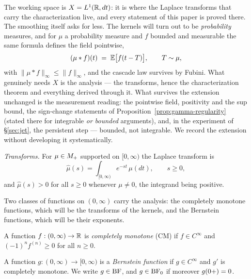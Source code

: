 \begin{remark}\label{rem:signal-model}
The working space is $X = L^1(\mathbb{R}, dt)$: it is where the Laplace transforms that carry the
characterization live, and every statement of this paper is proved there. The smoothing
itself asks for less. The kernels will turn out to be \emph{probability} measures, and for
$\mu$ a probability measure and $f$ bounded and measurable the same formula defines the
field pointwise,
\[
  (\mu * f)(t) \;=\; \mathbb{E}\bigl[f(t - T)\bigr], \qquad T \sim \mu,
\]
with $\|\mu * f\|_\infty \le \|f\|_\infty$, and the cascade law survives by Fubini. What
genuinely needs $X$ is the analysis --- the transforms, hence the characterization theorem
and everything derived through it. What survives the extension unchanged is the
measurement reading: the pointwise field, positivity and the sup bound, the sign-change
statements of Proposition~\ref{prop:gamma-regularity} (stated there for integrable
\emph{or bounded} arguments), and, in the experiment of \S\ref{sec:jet}, the persistent
step --- bounded, not integrable. We record the extension without developing it
systematically.
\end{remark}

\emph{Transforms.} For $\mu \in M_+$ supported on $[0,\infty)$ the Laplace transform is
\[
  \hat\mu(s) = \int_{[0,\infty)} e^{-st}\,\mu(dt), \qquad s \ge 0 ,
\]
and $\hat\mu(s) > 0$ for all $s \ge 0$ whenever $\mu \ne 0$, the integrand being positive.

Two classes of functions on $(0,\infty)$ carry the analysis: the completely monotone
functions, which will be the transforms of the kernels, and the Bernstein functions, which
will be their exponents.

\begin{definition}\label{def:completely-monotone}
A function $f : (0,\infty) \to \mathbb{R}$ is \emph{completely monotone} (CM) if $f \in C^\infty$
and $(-1)^n f^{(n)} \ge 0$ for all $n \ge 0$.
\end{definition}

\begin{definition}\label{def:bernstein-function}
A function $g : (0,\infty) \to [0,\infty)$ is a \emph{Bernstein function} if $g \in C^\infty$
and $g'$ is completely monotone. We write $g \in \mathrm{BF}$, and $g \in \mathrm{BF}_0$ if moreover
$g(0{+}) = 0$.
\end{definition}

